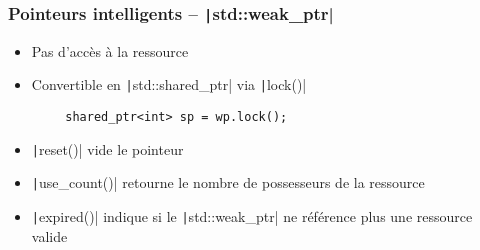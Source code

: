 \documentclass[C++.tex]{subfiles}
\begin{document}
\begin{frame}[fragile]
	\frametitle{Pointeurs intelligents -- \texttt|std::weak_ptr|}
	\begin{itemize}
		\item Pas d'accès à la ressource
		\item Convertible en \texttt|std::shared_ptr| via \texttt|lock()|

	\end{itemize}

	\begin{verbatim}
		shared_ptr<int> sp = wp.lock();
	\end{verbatim}

	\begin{itemize}
		\item \texttt|reset()| vide le pointeur
		\item \texttt|use_count()| retourne le nombre de possesseurs de la ressource


		\item \texttt|expired()| indique si le \texttt|std::weak_ptr| ne référence plus une ressource valide

	\end{itemize}
\end{frame}
\end{document}

